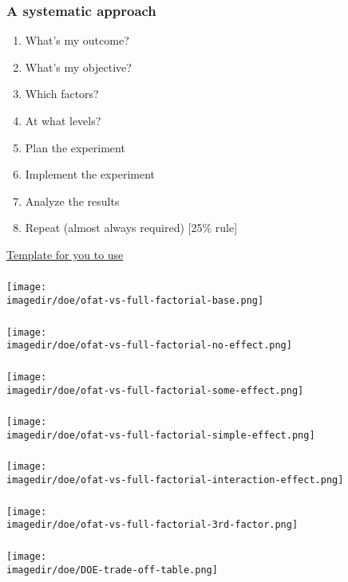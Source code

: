 \documentclass[handout,11pt,aspectratio=169,mathserif]{beamer}
\begin{document}
\begin{frame}\frametitle{A systematic approach } 
	\Large
	 \begin{enumerate}
	 	\item	What's my outcome? \pause
	 	\item	What's my objective? \pause
	 	\item	Which factors? \pause
		\item	At what levels?\pause
	 	\item	Plan the experiment \pause
	 	\item	Implement the experiment\pause
	 	\item	Analyze the results\pause
		\item	Repeat (almost always required) [25\% rule]
	 \end{enumerate}
	 
 	 \vspace{12pt}
	 \small
	 {\color{purple}  \href{http://yint.org/template}{Template for you to use}}
\end{frame}

\begin{frame}\frametitle{}
	\centerline{\texttt{[image: \\imagedir/doe/ofat-vs-full-factorial-base.png]}}
\end{frame}
\begin{frame}\frametitle{}
	\centerline{\texttt{[image: \\imagedir/doe/ofat-vs-full-factorial-no-effect.png]}}
\end{frame}
\begin{frame}\frametitle{}
	\centerline{\texttt{[image: \\imagedir/doe/ofat-vs-full-factorial-some-effect.png]}}
\end{frame}
\begin{frame}\frametitle{}
	\centerline{\texttt{[image: \\imagedir/doe/ofat-vs-full-factorial-simple-effect.png]}}
\end{frame}
\begin{frame}\frametitle{}
	\centerline{\texttt{[image: \\imagedir/doe/ofat-vs-full-factorial-interaction-effect.png]}}
\end{frame}
\begin{frame}\frametitle{}
	\centerline{\texttt{[image: \\imagedir/doe/ofat-vs-full-factorial-3rd-factor.png]}}
\end{frame}

\begin{frame}\frametitle{}
	\centerline{\texttt{[image: \\imagedir/doe/DOE-trade-off-table.png]}}
\end{frame}
\end{document}
